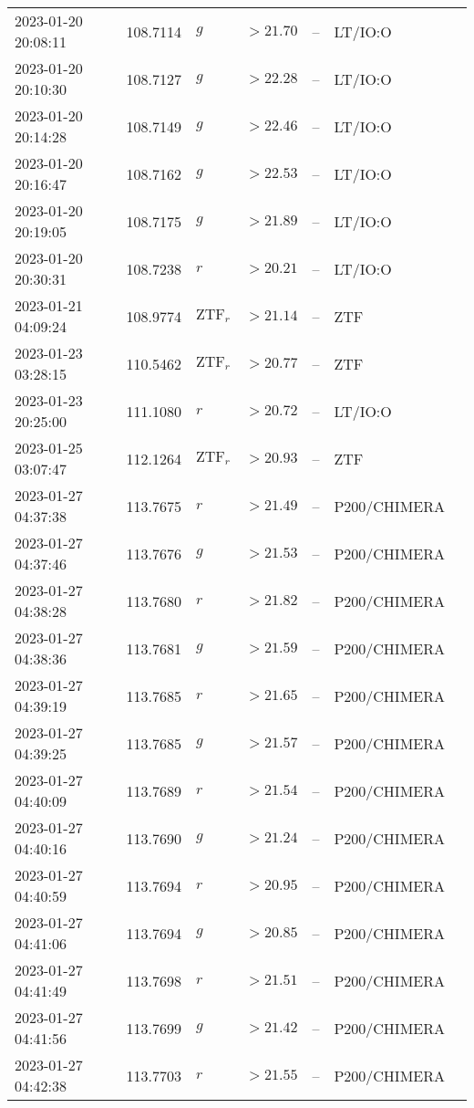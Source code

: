 \documentclass{nature_plusfigure}
\begin{document}
\begin{supplement}
\begin{center}
\begin{longtable}{lllllll}
2023-01-20 20:08:11 & 108.7114 & $g$ & $>21.70$ & -- & LT/IO:O &  \\ 
2023-01-20 20:10:30 & 108.7127 & $g$ & $>22.28$ & -- & LT/IO:O &  \\ 
2023-01-20 20:14:28 & 108.7149 & $g$ & $>22.46$ & -- & LT/IO:O &  \\ 
2023-01-20 20:16:47 & 108.7162 & $g$ & $>22.53$ & -- & LT/IO:O &  \\ 
2023-01-20 20:19:05 & 108.7175 & $g$ & $>21.89$ & -- & LT/IO:O &  \\ 
2023-01-20 20:30:31 & 108.7238 & $r$ & $>20.21$ & -- & LT/IO:O &  \\ 
2023-01-21 04:09:24 & 108.9774 & $\mathrm{ZTF}_{r}$ & $>21.14$ & -- & ZTF &  \\ 
2023-01-23 03:28:15 & 110.5462 & $\mathrm{ZTF}_{r}$ & $>20.77$ & -- & ZTF &  \\ 
2023-01-23 20:25:00 & 111.1080 & $r$ & $>20.72$ & -- & LT/IO:O &  \\ 
2023-01-25 03:07:47 & 112.1264 & $\mathrm{ZTF}_{r}$ & $>20.93$ & -- & ZTF &  \\ 
2023-01-27 04:37:38 & 113.7675 & $r$ & $>21.49$ & -- & P200/CHIMERA &  \\ 
2023-01-27 04:37:46 & 113.7676 & $g$ & $>21.53$ & -- & P200/CHIMERA &  \\ 
2023-01-27 04:38:28 & 113.7680 & $r$ & $>21.82$ & -- & P200/CHIMERA &  \\ 
2023-01-27 04:38:36 & 113.7681 & $g$ & $>21.59$ & -- & P200/CHIMERA &  \\ 
2023-01-27 04:39:19 & 113.7685 & $r$ & $>21.65$ & -- & P200/CHIMERA &  \\ 
2023-01-27 04:39:25 & 113.7685 & $g$ & $>21.57$ & -- & P200/CHIMERA &  \\ 
2023-01-27 04:40:09 & 113.7689 & $r$ & $>21.54$ & -- & P200/CHIMERA &  \\ 
2023-01-27 04:40:16 & 113.7690 & $g$ & $>21.24$ & -- & P200/CHIMERA &  \\ 
2023-01-27 04:40:59 & 113.7694 & $r$ & $>20.95$ & -- & P200/CHIMERA &  \\ 
2023-01-27 04:41:06 & 113.7694 & $g$ & $>20.85$ & -- & P200/CHIMERA &  \\ 
2023-01-27 04:41:49 & 113.7698 & $r$ & $>21.51$ & -- & P200/CHIMERA &  \\ 
2023-01-27 04:41:56 & 113.7699 & $g$ & $>21.42$ & -- & P200/CHIMERA &  \\ 
2023-01-27 04:42:38 & 113.7703 & $r$ & $>21.55$ & -- & P200/CHIMERA &  \\ 

\end{longtable}
\end{center}
\end{supplement}
\end{document}
